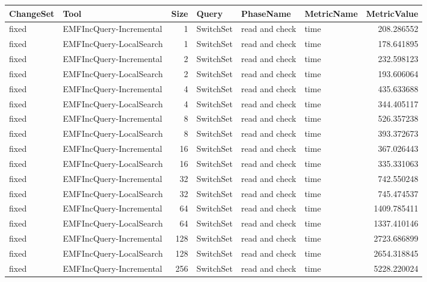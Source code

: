 \begin{table}
\centering
\footnotesize
\begin{tabular}{| l | l | r | l | l | l | r |}
\hline
\sf ChangeSet & \sf Tool & \sf Size & \sf Query & \sf PhaseName & \sf MetricName & \sf MetricValue\\\hline

fixed & EMFIncQuery-Incremental & 1 & SwitchSet & read and check & time & 208.286552\\\hline
fixed & EMFIncQuery-LocalSearch & 1 & SwitchSet & read and check & time & 178.641895\\\hline
fixed & EMFIncQuery-Incremental & 2 & SwitchSet & read and check & time & 232.598123\\\hline
fixed & EMFIncQuery-LocalSearch & 2 & SwitchSet & read and check & time & 193.606064\\\hline
fixed & EMFIncQuery-Incremental & 4 & SwitchSet & read and check & time & 435.633688\\\hline
fixed & EMFIncQuery-LocalSearch & 4 & SwitchSet & read and check & time & 344.405117\\\hline
fixed & EMFIncQuery-Incremental & 8 & SwitchSet & read and check & time & 526.357238\\\hline
fixed & EMFIncQuery-LocalSearch & 8 & SwitchSet & read and check & time & 393.372673\\\hline
fixed & EMFIncQuery-Incremental & 16 & SwitchSet & read and check & time & 367.026443\\\hline
fixed & EMFIncQuery-LocalSearch & 16 & SwitchSet & read and check & time & 335.331063\\\hline
fixed & EMFIncQuery-Incremental & 32 & SwitchSet & read and check & time & 742.550248\\\hline
fixed & EMFIncQuery-LocalSearch & 32 & SwitchSet & read and check & time & 745.474537\\\hline
fixed & EMFIncQuery-Incremental & 64 & SwitchSet & read and check & time & 1409.785411\\\hline
fixed & EMFIncQuery-LocalSearch & 64 & SwitchSet & read and check & time & 1337.410146\\\hline
fixed & EMFIncQuery-Incremental & 128 & SwitchSet & read and check & time & 2723.686899\\\hline
fixed & EMFIncQuery-LocalSearch & 128 & SwitchSet & read and check & time & 2654.318845\\\hline
fixed & EMFIncQuery-Incremental & 256 & SwitchSet & read and check & time & 5228.220024\\\hline

\end{tabular}
\end{table}
